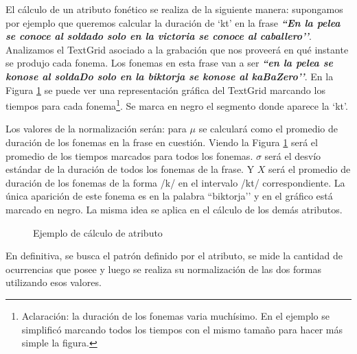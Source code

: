 El cálculo de un atributo fonético se realiza de la siguiente manera: supongamos por ejemplo que queremos calcular la duración de `kt’ en la frase \textbf{\textit{``En la pelea se conoce al soldado solo en la victoria se conoce al caballero’’}}. Analizamos el TextGrid asociado a la grabación que nos proveerá en qué instante se produjo cada fonema. Los fonemas en esta frase van a ser \textbf{\textit{``en la pelea se konose al soldaDo solo en la biktorja se konose al kaBaZero’’}}. En la Figura \ref{ejemploAtribFon} se puede ver una representación gráfica del TextGrid marcando los tiempos para cada fonema\footnote{Aclaración: la duración de los fonemas varia muchísimo. En el ejemplo se simplificó marcando todos los tiempos con el mismo tamaño para hacer más simple la figura.}. Se marca en negro el segmento donde aparece la `kt’.

Los valores de la normalización serán: para $\mu$ se calculará como el promedio de duración de los fonemas en la frase en cuestión. Viendo la Figura \ref{ejemploAtribFon} será el promedio de los tiempos marcados para todos los fonemas. $\sigma$ será el desvío estándar de la duración de todos los fonemas de la frase. Y $X$ será el promedio de duración de los fonemas de la forma /k/ en el intervalo /kt/ correspondiente. La única aparición de este fonema es en la palabra ``biktorja’’ y en el gráfico está marcado en negro. La misma idea se aplica en el cálculo de los demás atributos.

\begin{figure}[H]
\centering
{}
\caption{Ejemplo de cálculo de atributo}
\label{ejemploAtribFon}
\end{figure}

En definitiva, se busca el patrón definido por el atributo, se mide la cantidad de ocurrencias que posee y luego se realiza su normalización de las dos formas utilizando esos valores. 

